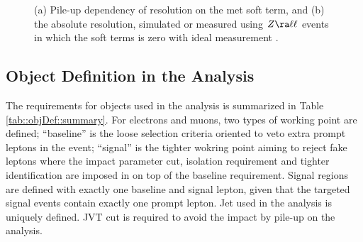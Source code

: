 \begin{figure}[h]
  \centering
    \caption{ (a) Pile-up dependency of resolution on the met soft term, and (b) the absolute resolution,
      simulated or measured using $Z\ra \ell\ell$ events in which the soft terms is zero with ideal measurement \cite{177_MET_data2016}. 
      \label{fig::objDef::metPerformance}
 }
\end{figure}



\subsection{Object Definition in the Analysis} \label{sec::objDef::objDef}
The requirements for objects used in the analysis is summarized in Table \ref{tab::objDef::summary}.
For electrons and muons, two types of working point are defined;
``baseline'' is the loose selection criteria oriented to veto extra prompt leptons in the event; 
``signal'' is the tighter wokring point aiming to reject fake leptons where the impact parameter cut, isolation requirement and tighter identification are imposed in on top of the baseline requirement.
Signal regions are defined with exactly one baseline and signal lepton, given that the targeted signal events contain exactly one prompt lepton. Jet used in the analysis is uniquely defined. JVT cut is required to avoid the impact by pile-up on the analysis. \\


